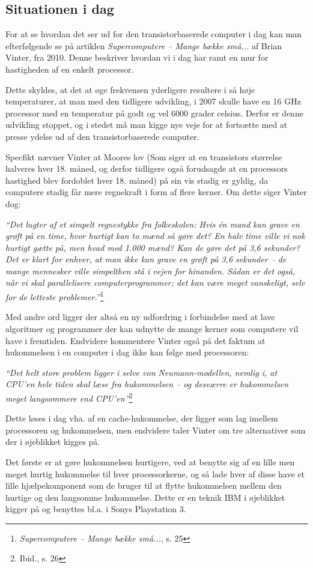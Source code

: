 \documentclass[10pt,a4paper]{article}
\newcommand{\citat}[2]{\begin{justify}\textit{``#1''}\hspace{0.1cm}\footnote{#2}\end{justify}}
\begin{document}
\subsection{Situationen i dag}
For at se hvordan det ser ud for den transistorbaserede computer i dag kan man
efterfølgende se på artiklen \textit{Supercomputere -- Mange bække små...} af
Brian Vinter, fra 2010. Denne beskriver hvordan vi i dag har ramt en mur
for hastigheden af en enkelt processor.

Dette skyldes, at det at øge frekvensen yderligere resultere i så høje
temperaturer, at man med den tidligere udvikling, i 2007 skulle have en 16 GHz
processor med en temperatur på godt og vel 6000 grader celsius. Derfor er denne
udvikling stoppet, og i stedet må man kigge nye veje for at fortsætte med at
presse ydelse ud af den transistorbaserede computer.

Specfikt nævner Vinter at Moores lov (Som siger at en transistors størrelse
halveres hver 18. måned, og derfor tidligere også forudsagde at en processors
hastighed blev fordoblet hver 18. måned) på sin vis stadig er gyldig, da
computere stadig får mere regnekraft i form af flere kerner. Om dette siger
Vinter dog:\citat{Det lugter af et simpelt regnestykke fra folkeskolen: Hvis én
mand kan grave en grøft på en time, hvor hurtigt kan to mænd så gøre det? En
halv time ville vi nok hurtigt gætte på, men hvad med 1.000 mænd? Kan de gøre
det på 3,6 sekunder? Det er klart for enhver, at man ikke kan grave en grøft på
3,6 sekunder – de mange mennesker ville simpelthen stå i vejen for hinanden.
Sådan er det også, når vi skal parallelisere computerprogrammer; det kan være
meget vanskeligt, selv for de letteste problemer.}{\textit{Supercomputere --
Mange bække små...}, s. 25}

Med andre ord ligger der altså en ny udfordring i forbindelse med at lave
algoritmer og programmer der kan udnytte de mange kerner som computere vil have
i fremtiden. Endvidere kommentere Vinter også på det faktum at hukommelsen i en
computer i dag ikke kan følge med processoren: \citat{Det helt store problem
ligger i selve von Neumann-modellen, nemlig i, at CPU’en hele tiden skal læse
fra hukommelsen -- og desværre er hukommelsen meget langsommere end
CPU’en}{Ibid., s. 26}

Dette løses i dag vha. af en cache-hukommelse, der ligger som lag imellem
processoren og hukommelsen, men endvidere taler Vinter om tre alternativer som
der i øjeblikket kigges på.

Det første er at gøre hukommelsen hurtigere, ved at benytte sig af en lille men
meget hurtig hukommelse til hver processorkerne, og så lade hver af disse have
et lille hjælpekomponent som de bruger til at flytte hukommelsen mellem den
hurtige og den langsomme hukommelse. Dette er en teknik IBM i øjeblikket kigger
på og benyttes bl.a. i Sonys Playstation 3.
\end{document}
